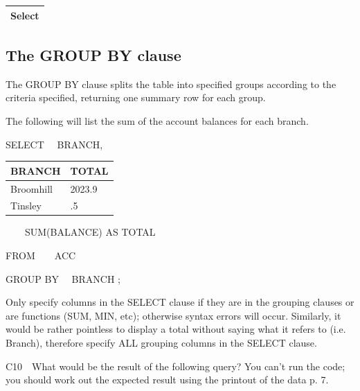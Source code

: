 \begin{flushleft}
\tablefirsthead{}
\tablehead{}
\tabletail{}
\tablelasttail{}
\begin{supertabular}{|m{14.583cm}|}
\hline
Select

\\\hline
\end{supertabular}
\end{flushleft}
\subsection{The GROUP BY clause}
The GROUP BY clause splits the table into specified groups according to the criteria specified, returning one summary row for each group.

The following will list the sum of the account balances for each branch.

 SELECT \ \ BRANCH,

\begin{center}
\begin{minipage}{4.692cm}
\begin{flushleft}
\tablefirsthead{}
\tablehead{}
\tabletail{}
\tablelasttail{}
\begin{supertabular}{|m{2.4919999cm}|m{1.798cm}|}
\hline
BRANCH &
TOTAL\\\hline
Broomhill &
2023.9\\\hline
Tinsley &
.5\\
\end{supertabular}
\end{flushleft}
\end{minipage}
\end{center}
\ \ \ \ SUM(BALANCE) AS TOTAL

FROM\ \  \ \ ACC 

GROUP BY \ \ BRANCH ;

Only specify columns in the SELECT clause if they are in the grouping clauses or are functions (SUM, MIN, etc); otherwise syntax errors will occur.  Similarly, it would be rather pointless to display a total without saying what it refers to (i.e. Branch), therefore specify ALL grouping columns in the SELECT clause.

C10\ \ What would be the result of the following query?  You can't run the code; you should work out the expected result using the printout of the data p. 7.



